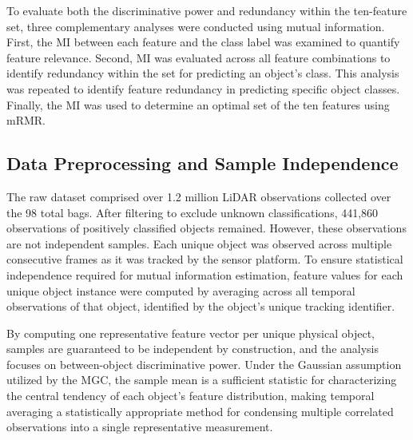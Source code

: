 \documentclass{erauthesis}
\begin{document}
To evaluate both the discriminative power and redundancy within the ten-feature set, three complementary analyses were conducted using mutual information. 
First, the \ac{MI} between each feature and the class label was examined to quantify feature relevance. 
Second, \ac{MI} was evaluated across all feature combinations to identify redundancy within the set for predicting an object's class. 
This analysis was repeated to identify feature redundancy in predicting specific object classes.
Finally, the \ac{MI} was used to determine an optimal set of the ten features using \ac{mRMR}.

\subsection{Data Preprocessing and Sample Independence}

The raw dataset comprised over 1.2 million LiDAR observations collected over the 98 total bags. After filtering to exclude unknown classifications, 441,860 observations of positively classified objects remained. However, these observations are not independent samples. Each unique object was observed across multiple consecutive frames as it was tracked by the sensor platform. To ensure statistical independence required for mutual information estimation, feature values for each unique object instance were computed by averaging across all temporal observations of that object, identified by the object's unique tracking identifier.

By computing one representative feature vector per unique physical object, samples are guaranteed to be independent by construction, and the analysis focuses on between-object discriminative power. Under the Gaussian assumption utilized by the \ac{MGC}, the sample mean is a sufficient statistic for characterizing the central tendency of each object's feature distribution, making temporal averaging a statistically appropriate method for condensing multiple correlated observations into a single representative measurement.
\end{document}
